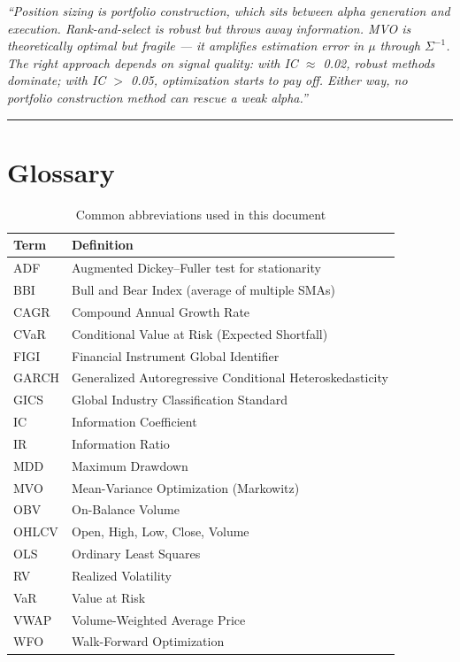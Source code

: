 \documentclass[a4paper, 11pt]{report}
\theoremstyle{definition}
\theoremstyle{remark}
\begin{document}
\begin{description}[style=nextline, leftmargin=1.8cm]
    \item[Interview Takeaway]
        \emph{``Position sizing is portfolio construction, which sits
        between alpha generation and execution.  Rank-and-select is
        robust but throws away information.  MVO is theoretically
        optimal but fragile --- it amplifies estimation error in
        $\mu$ through $\Sigma^{-1}$.  The right approach depends on
        signal quality: with IC $\approx$ 0.02, robust methods
        dominate; with IC $>$ 0.05, optimization starts to pay off.
        Either way, no portfolio construction method can rescue a
        weak alpha.''}
\end{description}

\bigskip\noindent\rule{\textwidth}{0.4pt}


\chapter{Glossary}
\label{app:glossary}

\begin{table}[ht]
\centering
\small
\begin{tabular}{@{}ll@{}}
\toprule
\textbf{Term} & \textbf{Definition} \\
\midrule
ADF       & Augmented Dickey--Fuller test for stationarity \\
BBI       & Bull and Bear Index (average of multiple SMAs) \\
CAGR      & Compound Annual Growth Rate \\
CVaR      & Conditional Value at Risk (Expected Shortfall) \\
FIGI      & Financial Instrument Global Identifier \\
GARCH     & Generalized Autoregressive Conditional Heteroskedasticity \\
GICS      & Global Industry Classification Standard \\
IC        & Information Coefficient \\
IR        & Information Ratio \\
MDD       & Maximum Drawdown \\
MVO       & Mean-Variance Optimization (Markowitz) \\
OBV       & On-Balance Volume \\
OHLCV     & Open, High, Low, Close, Volume \\
OLS       & Ordinary Least Squares \\
RV        & Realized Volatility \\
VaR       & Value at Risk \\
VWAP      & Volume-Weighted Average Price \\
WFO       & Walk-Forward Optimization \\
\bottomrule
\end{tabular}
\caption{Common abbreviations used in this document}
\end{table}
\end{document}
